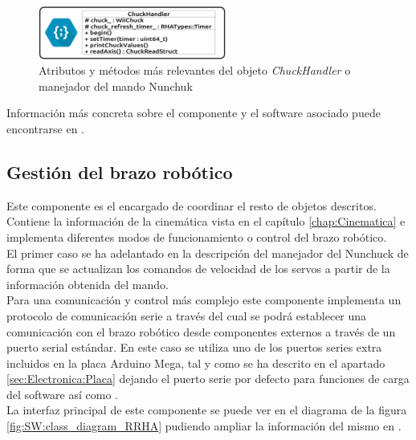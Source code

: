         \begin{figure}[H]
          	\centering
          	\includegraphics[width=0.55\textwidth]{figuras/Imagenes_SW/class_diagram_CHH.jpg}
          	\caption{Atributos y métodos más relevantes del objeto \textit{ChuckHandler} o manejador del mando Nunchuk }
          	\label{fig:SW:class_diagram_CHH}
        \end{figure}

		Información más concreta sobre el componente y el software asociado puede encontrarse en \cite{rha_doc}.
    \subsection{Gestión del brazo robótico} \label{subsec:SW:robotrha}
        Este componente es el encargado de coordinar el resto de objetos descritos. Contiene la información de la cinemática vista en el capítulo \ref{chap:Cinematica} e implementa diferentes modos de funcionamiento o control del brazo robótico.
        \\
        
        El primer caso se ha adelantado en la descripción del manejador del Nunchuck de forma que se actualizan los comandos de velocidad de los servos a partir de la información obtenida del mando.
        \\
        
        Para una comunicación y control más complejo este componente implementa un protocolo de comunicación serie a través del cual se podrá establecer una comunicación con el brazo robótico desde componentes externos a través de un puerto serial estándar. En este caso se utiliza uno de los puertos series extra incluidos en la placa Arduino Mega, tal y como se ha descrito en el apartado \ref{sec:Electronica:Placa} dejando el puerto serie por defecto para funciones de carga del software así como .
        \\
        
        La interfaz principal de este componente se puede ver en el diagrama de la figura \ref{fig:SW:class_diagram_RRHA} pudiendo ampliar la información del mismo en \cite{rha_doc}.
        \\
        
